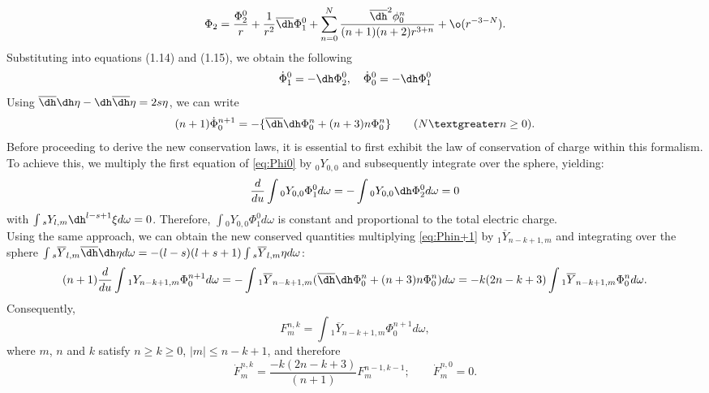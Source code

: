 \begin{equation}\label{eq:Phi2}
  \Phi_{2} = \frac{\Phi_{2}^{0}}{r} + \frac{1}{r^2}\overline{\dh} \Phi_{1}^{0} + \sum_{n=0}^{N}\frac{\overline{\dh}^2 \phi_{0}^{n}}{(n+1)(n+2)r^{3+n}}+\o(r^{-3-N}).
\end{equation}
Substituting into equations (1.14) and (1.15), we obtain the following
\begin{equation}\label{eq:Phi0}
  \dot{\Phi}_{1}^{0} = -\dh\Phi_{2}^{0}, \quad \dot{\Phi}_{0}^{0} = -\dh \Phi_{1}^{0}
\end{equation}
Using  $\overline{\dh}\dh \eta - \dh \overline{\dh} \eta = 2s\eta$, we can write
\begin{equation}\label{eq:Phin+1}
  (n + 1)\dot{\Phi}_{0}^{n+1} = -\{\overline{\dh}\dh \Phi_{0}^{n} + (n+3)n\Phi_{0}^{n}\} \qquad (N \textgreater n \geq 0).
\end{equation}
Before proceeding to derive the new conservation laws, it is essential to first exhibit the law of conservation of charge within this formalism. To achieve this, we multiply the first equation of \eqref{eq:Phi0} by $_{0}Y_{0,0}$ and subsequently integrate over the sphere, yielding:
\begin{equation}\label{eq:YPhi0}
  \frac{d}{du} \int {_{0}Y_{0,0}\Phi_{1}^{0} d\omega} = - \int {_{0}Y_{0,0}\dh \Phi_{2}^{0} d\omega} = 0
\end{equation}
with $\int{_{s}Y_{l,m}\dh^{l-s+1}\xi d\omega} = 0$. Therefore, $\int {_{0}Y_{0,0}\Phi_{1}^{0} d\omega}$ is constant and proportional to the total electric charge.\\
Using the same approach, we can obtain the new conserved quantities multiplying \eqref{eq:Phin+1} by $_{1}\overline{Y}_{n-k+1,m}$ and integrating over the sphere $\int {_{s}\overline{Y}_{l,m}\overline{\dh}\dh \eta d \omega} = -(l-s)(l+s+1) \int{_{s}\overline{Y}_{l,m}\eta d\omega}$:
\begin{equation}\label{eq:Eleccharge}
  (n+1)\frac{d}{du}\int{_{1}Y_{n-k+1,m}\Phi_{0}^{n+1} d\omega} = - \int{_{1}\overline{Y}_{n-k+1,m}(\overline{\dh}\dh \Phi_{0}^{n}+(n+3)n\Phi_{0}^{n})d\omega} = -k(2n-k+3)\int{_{1}\overline{Y}_{n-k+1,m}\Phi_{0}^{n} d\omega}.
\end{equation}
Consequently,
\begin{equation}\label{eq:F}
  F_{m}^{n,k} = \int{_{1}\overline{Y}_{n-k+1,m}\Phi_{0}^{n+1} d\omega},
\end{equation}
where $m$, $n$ and $k$ satisfy $n \geq k \geq 0$, $|m| \leq n-k+1$, and therefore 
\begin{equation}\label{eq:Fdot}
  \dot{F}_{m}^{n,k} = \frac{-k(2n-k+3)}{(n+1)}F_{m}^{n-1,k-1} ; \qquad \dot{F}_{m}^{n,0} = 0.
\end{equation}
